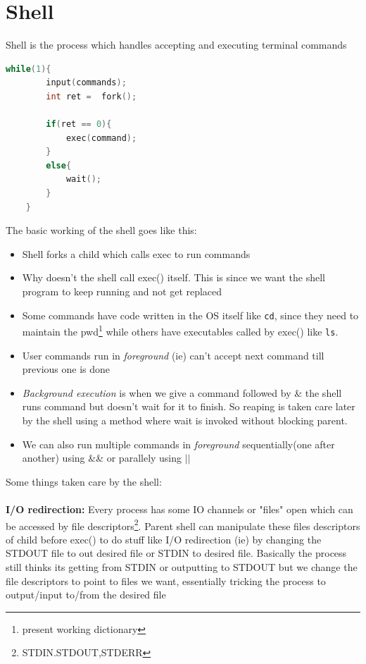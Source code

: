 \documentclass[12pt]{article}
\begin{document}
\section{Shell}
Shell is the process which handles accepting and executing terminal commands
\begin{lstlisting}[language=C++,caption = Shell code]
    while(1){
        input(commands);
        int ret =  fork();

        if(ret == 0){
            exec(command);
        }
        else{
            wait();
        }
    }  
\end{lstlisting}
The basic working of the shell goes like this:
\begin{itemize}[topsep=0pt, partopsep=0pt, itemsep=0pt, parsep=0pt]
    \item Shell forks a child which calls exec to run commands
    \item Why doesn't the shell call exec() itself. This is since we want the shell program to keep running and not get replaced
    \item Some commands have code written in the OS itself like \texttt{cd}, since they need to maintain the pwd\footnote{present working dictionary} while others
    have executables called by exec() like \texttt{ls}.
    \item User commands run in \textit{foreground} (ie) can't accept next command till previous one is done
    \item \textit{Background execution} is when we give a command followed by \& the shell runs command but doesn't wait for it to finish.
    So reaping is taken care later by the shell using a method where wait is invoked without blocking parent.
    \item We can also run multiple commands in \textit{foreground} sequentially(one after another) using \&\& or parallely using $||$ 
\end{itemize}


Some things taken care by the shell:\\\\
\textbf{I/O redirection:}
Every process has some IO channels or "files" open which can be accessed by file descriptors\footnote{STDIN.STDOUT,STDERR}.
Parent shell can manipulate these files descriptors of child before exec() to do stuff like I/O redirection (ie) by changing the STDOUT file to out desired file or STDIN to desired file.
Basically the process still thinks its getting from STDIN or outputting to STDOUT but we change the file descriptors to point to files we want, essentially tricking the process to output/input to/from the desired file
\end{document}
